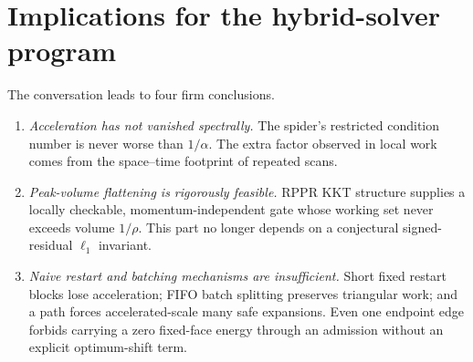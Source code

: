 \section{Implications for the hybrid-solver program}
\label{sec:implications}

The conversation leads to four firm conclusions.

\begin{enumerate}[leftmargin=2em]
\item \emph{Acceleration has not vanished spectrally.}
The spider's restricted condition number is never worse than $1/\alpha$.
The extra factor observed in local work comes from the space--time footprint
of repeated scans.

\item \emph{Peak-volume flattening is rigorously feasible.}
RPPR KKT structure supplies a locally checkable, momentum-independent gate
whose working set never exceeds volume $1/\rho$.  This part no longer depends
on a conjectural signed-residual $\ell_1$ invariant.

\item \emph{Naive restart and batching mechanisms are insufficient.}
Short fixed restart blocks lose acceleration; FIFO batch splitting preserves
triangular work; and a path forces accelerated-scale many safe expansions.
Even one endpoint edge forbids carrying a zero fixed-face energy through an
admission without an explicit optimum-shift term.


\end{enumerate}
